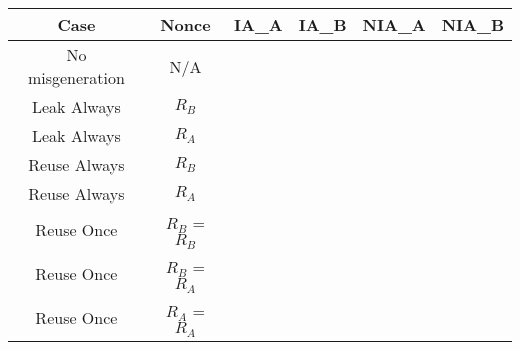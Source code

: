 \documentclass[crop]{standalone}
\newcommand{\noattack}{\color{ForestGreen}\usym{2713}\color{black}}
\newcommand{\attack}{\color{red}\usym{2717}\color{black}}
\begin{document}
\parbox{15cm}{
\begin{tabular}{|c|c|c|c|c|c|}
\hline
Case & Nonce & IA\_A & IA\_B & NIA\_A & NIA\_B \\ \hline
No misgeneration & N/A & \noattack & \noattack & \noattack & \noattack\\ \hline
Leak Always & $R_B$ & \noattack & \noattack & \noattack & \noattack\\ \hline
Leak Always & $R_A$ & \noattack & \noattack & \noattack & \noattack\\ \hline
Reuse Always & $R_B$ & \noattack & \attack & \noattack & \noattack\\ \hline
Reuse Always & $R_A$ & \attack & \noattack & \attack & \noattack\\ \hline
Reuse Once & $R_B$ = $R_B$ & \noattack & \attack & \noattack & \noattack\\ \hline
Reuse Once & $R_B$ = $R_A$ & \noattack & \noattack & \noattack & \noattack\\ \hline
Reuse Once & $R_A$ = $R_A$ & \attack & \noattack & \attack & \noattack\\ \hline
\end{tabular}}
\end{document}

